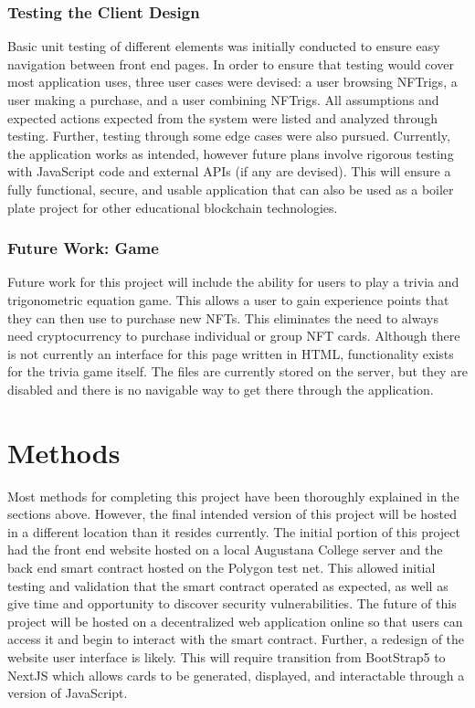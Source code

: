 \documentclass[acmsmall,nonacm]{acmart}
\begin{document}
\subsubsection{Testing the Client Design}
Basic unit testing of different elements was initially conducted to ensure easy navigation between front end pages. In order to ensure that testing would cover most application uses, three user cases were devised: a user browsing NFTrigs, a user making a purchase, and a user combining NFTrigs. All assumptions and expected actions expected from the system were listed and analyzed through testing. Further, testing through some edge cases were also pursued. Currently, the application works as intended, however future plans involve rigorous testing with JavaScript code and external APIs (if any are devised). This will ensure a fully functional, secure, and usable application that can also be used as a boiler plate project for other educational blockchain technologies. 


\subsubsection{Future Work: Game}
Future work for this project will include the ability for users to play a trivia and trigonometric equation game. This allows a user to gain experience points that they can then use to purchase new NFTs. This eliminates the need to always need cryptocurrency to purchase individual or group NFT cards. Although there is not currently an interface for this page written in HTML, functionality exists for the trivia game itself. The files are currently stored on the server, but they are disabled and there is no navigable way to get there through the application.

\section{Methods}
Most methods for completing this project have been thoroughly explained in the sections above. However, the final intended version of this project will be hosted in a different location than it resides currently. The initial portion of this project had the front end website hosted on a local Augustana College server and the back end smart contract hosted on the Polygon test net. This allowed initial testing and validation that the smart contract operated as expected, as well as give time and opportunity to discover security vulnerabilities. The future of this project will be hosted on a decentralized web application online so that users can access it and begin to interact with the smart contract. Further, a redesign of the website user interface is likely. This will require transition from BootStrap5 to NextJS which allows cards to be generated, displayed, and interactable through a version of JavaScript.
\end{document}
